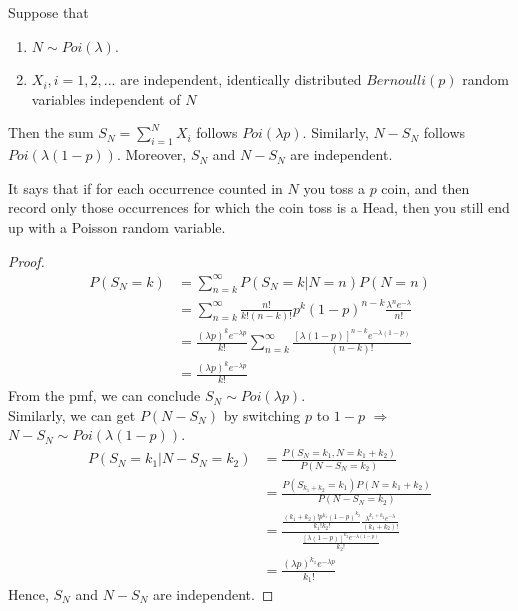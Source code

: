 \documentclass[11pt]{elegantbook}
\begin{document}
\begin{lemma}
    Suppose that
    \begin{enumerate}[(1)]
        \item $N\sim Poi(\lambda)$.
        \item $X_i,i=1,2,...$ are independent, identically distributed $Bernoulli(p)$ random variables independent of $N$
    \end{enumerate}
    Then the sum $S_N=\sum_{i=1}^N X_i$ follows $Poi(\lambda p)$. Similarly, $N-S_N$ follows $Poi(\lambda(1-p))$. Moreover, $S_N$ and $N-S_N$ are independent.
\end{lemma}
It says that if for each occurrence counted in $N$ you toss a $p$ coin, and then record only those occurrences for which the coin toss is a Head, then you still end up with a Poisson random variable.
\begin{proof}
    \begin{equation}
        \begin{aligned}
            P(S_N=k)&=\sum_{n=k}^\infty P(S_N=k|N=n)P(N=n)\\
            &=\sum_{n=k}^\infty \frac{n!}{k!(n-k)!}p^k(1-p)^{n-k}\frac{\lambda^n e^{-\lambda}}{n!}\\
            &=\frac{(\lambda p)^k e^{-\lambda p}}{k!}\sum_{n=k}^\infty \frac{[\lambda(1-p)]^{n-k}e^{-\lambda(1-p)}}{(n-k)!}\\
            &=\frac{(\lambda p)^k e^{-\lambda p}}{k!}
        \end{aligned}
        \nonumber
    \end{equation}
    From the pmf, we can conclude $S_N\sim Poi(\lambda p)$.\\
    Similarly, we can get $P(N-S_N)$ by switching $p$ to $1-p$ $\Rightarrow$ $N-S_N\sim Poi(\lambda (1-p))$.
    \begin{equation}
        \begin{aligned}
            P(S_N=k_1|N-S_N=k_2)&=\frac{P(S_N=k_1,N=k_1+k_2)}{P(N-S_N=k_2)}\\&=\frac{P(S_{k_1+k_2}=k_1) P(N=k_1+k_2)}{P(N-S_N=k_2)}\\
            &=\frac{\frac{(k_1+k_2)!p^{k_1}(1-p)^{k_2}}{k_1! k_2!} \frac{\lambda^{k_1+k_2}e^{-\lambda}}{(k_1+k_2)!}}{\frac{[\lambda(1-p)]^{k_2}e^{-\lambda(1-p)}}{k_2!}}\\
            &=\frac{(\lambda p)^{k_1} e^{-\lambda p}}{k_1!}
        \end{aligned}
        \nonumber
    \end{equation}
    Hence, $S_N$ and $N-S_N$ are independent.
\end{proof}
\end{document}
